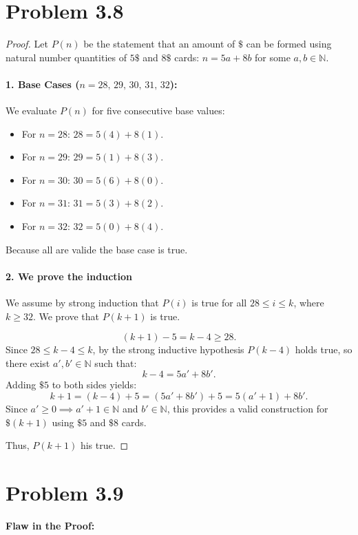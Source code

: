 \documentclass[12pt]{article}
\begin{document}
\section*{Problem 3.8}
\begin{proof}
Let $P(n)$ be the statement that an amount of $\$$ can be formed using natural number quantities of $5\$$ and $8\$$ cards: $n = 5a + 8b$ for some $a, b \in \mathbb{N}$.

\paragraph{1. Base Cases ($n = 28, \,29, \,30,\, 31,\, 32$):}
We evaluate $P(n)$ for five consecutive base values:
\begin{itemize}
    \item For $n = 28$: $28 = 5(4) + 8(1)$.
    \item For $n = 29$: $29 = 5(1) + 8(3)$.
    \item For $n = 30$: $30 = 5(6) + 8(0)$.
    \item For $n = 31$: $31 = 5(3) + 8(2)$.
    \item For $n = 32$: $32 = 5(0) + 8(4)$.
\end{itemize}
Because all are valide the base case is true.

\paragraph{2. We prove the induction}
We assume by strong induction that $P(i)$ is true for all $28 \le i \le k$, where $k \ge 32$. We prove that $P(k+1)$ is true.

\[
(k+1) - 5 = k - 4 \ge 28.
\]
Since $28 \le k - 4 \le k$, by the strong inductive hypothesis $P(k-4)$ holds true, so there exist $a', b' \in \mathbb{N}$ such that:
\[
k - 4 = 5a' + 8b'.
\]
Adding $\$5$ to both sides yields:
\[
k + 1 = (k - 4) + 5 = (5a' + 8b') + 5 = 5(a' + 1) + 8b'.
\]
Since $a' \ge 0 \implies a' + 1 \in \mathbb{N}$ and $b' \in \mathbb{N}$, this provides a valid construction for $\$(k+1)$ using $\$5$ and $\$8$ cards.

Thus, $P(k+1)$ his true.\end{proof}


\newpage
\section*{Problem 3.9}

\textbf{Flaw in the Proof:}
\end{document}
